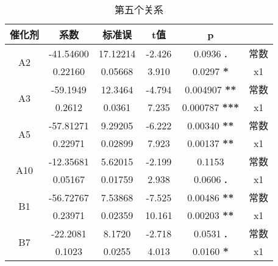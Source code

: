 \documentclass{article}
\begin{document}
\begin{table}
    \centering
    \caption{第五个关系}
    \begin{tabular}{c|c|c|c|c|c}
        \hline
        催化剂               & 系数      & 标准误   & t值    & p                     &      \\
        \hline
        \multirow{2}{*}{A2}  & -41.54600 & 17.12214 & -2.426 & 0.0936 \textbf{.}     & 常数 \\
                             & 0.22160   & 0.05668  & 3.910  & 0.0297 \textbf{*}     & x1   \\
        \hline
        \multirow{2}{*}{A3}  & -59.1949  & 12.3464  & -4.794 & 0.004907 \textbf{**}  & 常数 \\
                             & 0.2612    & 0.0361   & 7.235  & 0.000787 \textbf{***} & x1   \\
        \hline
        \multirow{2}{*}{A5}  & -57.81271 & 9.29205  & -6.222 & 0.00340 \textbf{**}   & 常数 \\
                             & 0.22971   & 0.02899  & 7.923  & 0.00137 \textbf{**}   & x1   \\
        \hline
        \multirow{2}{*}{A10} & -12.35681 & 5.62015  & -2.199 & 0.1153                & 常数 \\
                             & 0.05167   & 0.01759  & 2.938  & 0.0606 \textbf{.}     & x1   \\
        \hline
        \multirow{2}{*}{B1} & -56.72767 & 7.53868  & -7.525 & 0.00486 \textbf{**}   & 常数 \\
                             & 0.23971   & 0.02359  & 10.161 & 0.00203 \textbf{**}   & x1   \\
        \hline
        \multirow{2}{*}{B7} & -22.2081  & 8.1720   & -2.718 & 0.0531 \textbf{.}     & 常数 \\
                             & 0.1023    & 0.0255   & 4.013  & 0.0160 \textbf{*}     & x1   \\
        \hline
    \end{tabular}
\end{table}
\end{document}
